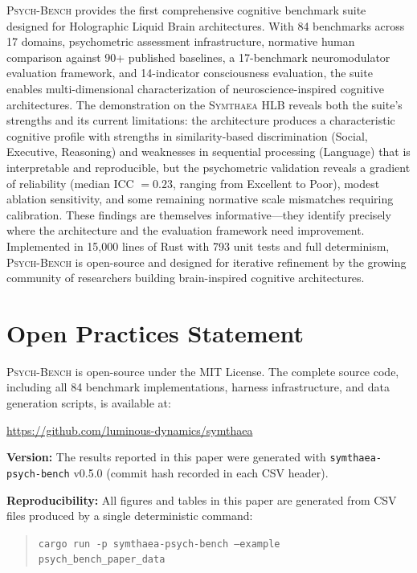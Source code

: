 \documentclass[11pt,letterpaper]{article}
\newcommand{\symthaea}{\textsc{Symthaea}}
\newcommand{\psychbench}{\textsc{Psych-Bench}}
\newcommand{\hlb}{\textsc{HLB}}
\begin{document}
\psychbench{} provides the first comprehensive cognitive benchmark suite designed for Holographic Liquid Brain architectures. With 84 benchmarks across 17 domains, psychometric assessment infrastructure, normative human comparison against 90+ published baselines, a 17-benchmark neuromodulator evaluation framework, and 14-indicator consciousness evaluation, the suite enables multi-dimensional characterization of neuroscience-inspired cognitive architectures. The demonstration on the \symthaea{} \hlb{} reveals both the suite's strengths and its current limitations: the architecture produces a characteristic cognitive profile with strengths in similarity-based discrimination (Social, Executive, Reasoning) and weaknesses in sequential processing (Language) that is interpretable and reproducible, but the psychometric validation reveals a gradient of reliability (median ICC $= 0.23$, ranging from Excellent to Poor), modest ablation sensitivity, and some remaining normative scale mismatches requiring calibration. These findings are themselves informative---they identify precisely where the architecture and the evaluation framework need improvement. Implemented in 15,000 lines of Rust with 793 unit tests and full determinism, \psychbench{} is open-source and designed for iterative refinement by the growing community of researchers building brain-inspired cognitive architectures.

\section*{Open Practices Statement}

\psychbench{} is open-source under the MIT License. The complete source code, including all 84 benchmark implementations, harness infrastructure, and data generation scripts, is available at:

\begin{center}
\url{https://github.com/luminous-dynamics/symthaea}
\end{center}

\noindent\textbf{Version:} The results reported in this paper were generated with \texttt{symthaea-psych-bench} v0.5.0 (commit hash recorded in each CSV header).

\noindent\textbf{Reproducibility:} All figures and tables in this paper are generated from CSV files produced by a single deterministic command:
\begin{quote}
\texttt{cargo run -p symthaea-psych-bench --example psych\_bench\_paper\_data}
\end{quote}
\end{document}
